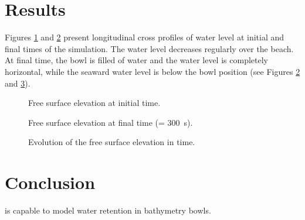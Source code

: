 \section{Results}

Figures \ref{fig:vasque:FreeSurfacet0} and \ref{fig:vasque:FreeSurfacetf}
present longitudinal cross profiles of water level at
initial and final times of the simulation.
The water level decreases regularly over the beach.
At final time, the bowl is filled of water and the water level is completely
horizontal, while the seaward water level is below the bowl position
(see Figures \ref{fig:vasque:FreeSurfacetf}
and \ref{fig:vasque:FreeSurface}).

\begin{figure}[H]
 \centering
  \caption{Free surface elevation at initial time.}\label{fig:vasque:FreeSurfacet0}
\end{figure}

\begin{figure}[H]
 \centering
  \caption{Free surface elevation at final time (= 300~s).}\label{fig:vasque:FreeSurfacetf}
\end{figure}

\begin{figure}[H]
 \centering
  \caption{Evolution of the free surface elevation in time.}\label{fig:vasque:FreeSurface}
\end{figure}

\section{Conclusion}

 is capable to model water retention in bathymetry bowls.
